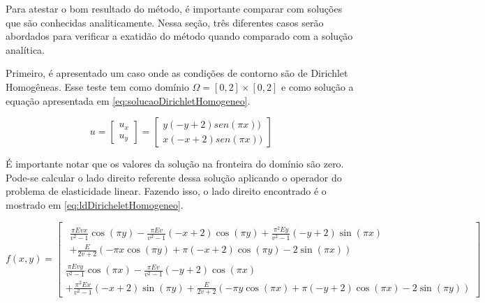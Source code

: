Para atestar o bom resultado do método, é importante comparar com soluções que são conhecidas analiticamente. Nessa seção, três diferentes casos serão abordados para verificar a exatidão do método quando comparado com a solução analítica.

Primeiro, é apresentado um caso onde as condições de contorno são de Dirichlet Homogêneas. Esse teste tem como domínio $ \Omega = [0, 2] \times [0, 2]$  e como solução a equação apresentada em \ref{eq:solucaoDirichletHomogeneo}.

\begin{equation}\label{eq:solucaoDirichletHomogeneo}
u = 
\begin{bmatrix}
u_x
\\ 
u_y
\end{bmatrix}
=
\begin{bmatrix}
y(-y+2)sen(\pi x))
\\ 
x(-x+2)sen(\pi x))
\end{bmatrix}
\end{equation}

É importante notar que os valores da solução na fronteira do domínio são zero. Pode-se calcular o lado direito referente dessa solução aplicando o operador do problema de elasticidade linear. Fazendo isso, o lado direito encontrado é o mostrado em \ref{eq:ldDiricheletHomogeneo}.

\begin{equation}\label{eq:ldDiricheletHomogeneo}
f(x, y) = 
\left[\begin{matrix}
\begin{split}
\frac{\pi E v x}{v^{2} - 1} \cos{\left (\pi y \right )} - \frac{\pi E v}{v^{2} - 1} \left(- x + 2\right) \cos{\left (\pi y \right )} + \frac{\pi^{2} E y}{v^{2} - 1} \left(- y + 2\right) \sin{\left (\pi x \right )} 
\\
+
\frac{E}{2 v + 2} \left(- \pi x \cos{\left (\pi y \right )} + \pi \left(- x + 2\right) \cos{\left (\pi y \right )} - 2 \sin{\left (\pi x \right )}\right)
\end{split}
\\

\frac{\pi E v y}{v^{2} - 1} \cos{\left (\pi x \right )} - \frac{\pi E v}{v^{2} - 1} \left(- y + 2\right) \cos{\left (\pi x \right )} 
\\
+ \frac{\pi^{2} E x}{v^{2} - 1} \left(- x + 2\right) \sin{\left (\pi y \right )} + \frac{E}{2 v + 2} \left(- \pi y \cos{\left (\pi x \right )} + \pi \left(- y + 2\right) \cos{\left (\pi x \right )} - 2 \sin{\left (\pi y \right )}\right)\end{matrix}\right]
\end{equation}


